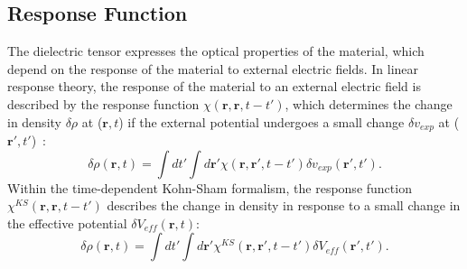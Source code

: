 \begin{refsection}
\subsection{Response Function} 

The dielectric tensor expresses the optical properties of the material, which 
depend on the response of the material to external electric fields. In linear 
response theory, the response of the material to an external electric field is 
described by the response function $\chi(\mathbf{r},\mathbf{r}, t - t')$, 
which determines the change in density $\delta \rho$ at ($\mathbf{r},t$) if the 
external potential undergoes a small change $\delta v_{exp}$ at 
($\mathbf{r}',t'$)~\cite{Harl2008}: 
\begin{equation}\label{dft:eq-response} 
\delta \rho (\mathbf{r},t) = \int dt' \int d\mathbf{r}' 
\chi(\mathbf{r},\mathbf{r}', t - t') \delta v_{exp} (\mathbf{r}',t'). 
\end{equation} 
Within the time-dependent Kohn-Sham formalism, the response function 
$\chi^{KS}(\mathbf{r},\mathbf{r}, t - t')$ describes the change in density in 
response to a small change in the effective potential $\delta 
V_{eff}(\mathbf{r},t)$: 
\begin{equation}\label{dft:eq-KSresponse} 
\delta \rho (\mathbf{r},t) = \int dt' \int d\mathbf{r}' 
\chi^{KS}(\mathbf{r},\mathbf{r}', t - t') \delta V_{eff} (\mathbf{r}',t'). 
\end{equation} 
 

\end{refsection}
